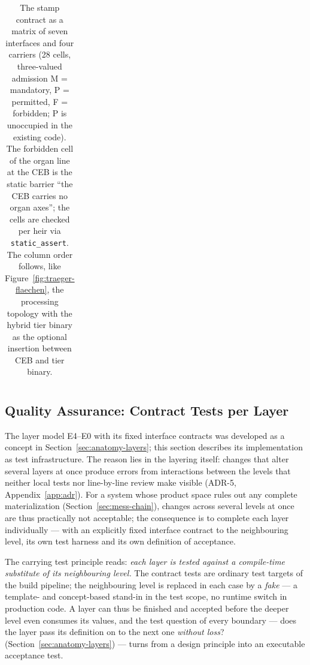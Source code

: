 \begin{nurkurz}
\begin{table}[htbp]
\begin{tabular}{@{}llcccc@{}}
\bottomrule
\end{tabular}
\caption{The stamp contract as a matrix of seven interfaces and four carriers (28 cells, three-valued
admission M = mandatory, P = permitted, F = forbidden; P is unoccupied in the existing code). The
forbidden cell of the organ line at the CEB is the static barrier \enquote{the CEB carries no organ axes};
the cells are checked per heir via \texttt{static\_assert}. The column order follows, like
Figure~\ref{fig:traeger-flaechen}, the processing topology with the hybrid tier binary as the optional
insertion between CEB and tier binary.}\label{tab:stempel-matrix}
\end{table}
\end{nurkurz}

\begin{nurlang}
\section{Quality Assurance: Contract Tests per Layer}\label{sec:impl-contracts}
The layer model E4--E0 with its fixed interface contracts was developed as a concept in
Section~\ref{sec:anatomy-layers}; this section describes its implementation as test infrastructure.
The reason lies in the layering itself: changes that alter several layers at once produce errors from
interactions between the levels that neither local tests nor line-by-line review make visible (ADR-5,
Appendix~\ref{app:adr}). For a system whose product space rules out any complete materialization
(Section~\ref{sec:mess-chain}), changes across several levels at once are thus practically not
acceptable; the consequence is to complete each layer individually --- with an explicitly fixed
interface contract to the neighbouring level, its own test harness and its own definition of
acceptance.

The carrying test principle reads: \emph{each layer is tested against a compile-time substitute of its
neighbouring level.} The contract tests are ordinary test targets of the build pipeline; the
neighbouring level is replaced in each case by a \emph{fake} --- a template- and concept-based stand-in
in the test scope, no runtime switch in production code. A layer can thus be finished and accepted
before the deeper level even consumes its values, and the test question of every boundary --- does the
layer pass its definition on to the next one \emph{without loss}?
(Section~\ref{sec:anatomy-layers}) --- turns from a design principle into an executable acceptance
test.


\end{nurlang}

